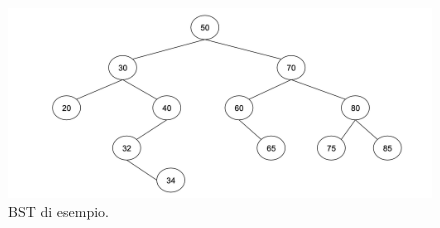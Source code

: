 \begin{figure}[h!] %
  \centering %
  \includegraphics[width=1\textwidth]{images/bst.png}
  \caption{BST di esempio.} %
  \label{fig:logo} %
\end{figure}


